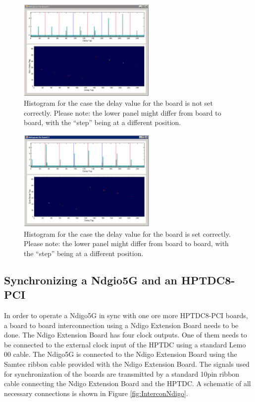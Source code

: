 		\begin{figure}[ht]
			\begin{center}
				\includegraphics[width=0.6\textwidth]{figures/HistoUncalib.pdf}
				\caption{Histogram for the case the delay value for the board is not set correctly. Please note: the lower panel might differ from board to board, with the ``step'' being at a different position.\label{fig:HistoUncalib}}
			\end{center}
		\end{figure}
		
		\begin{figure}[hb]
			\begin{center}
				\includegraphics[width=0.6\textwidth]{figures/HistoCalib.pdf}
				\caption{Histogram for the case the delay value for the board is set correctly. Please note: the lower panel might differ from board to board, with the ``step'' being at a different position.\label{fig:HistoCalib}}
			\end{center}
		\end{figure}
	
	\subsection{Synchronizing a Ndgio5G and an HPTDC8-PCI}
	
		In order to operate a Ndigo5G in sync with one ore more HPTDC8-PCI boards, a board to board interconnection using a Ndigo Extension Board needs to be done. The Ndigo Extension Board has four clock outputs. One of them needs to be connected to the external clock input of the HPTDC using a standard Lemo 00 cable. The Ndigo5G is connected to the Ndigo Extension Board using the Samtec ribbon cable provided with the Ndigo Extension Board. The signals used for synchronization of the boards are transmitted by a standard 10pin ribbon cable connecting the Ndigo Extension Board and the HPTDC. A schematic of all necessary connections is shown in Figure \ref{fig:InterconNdigo}.\par

